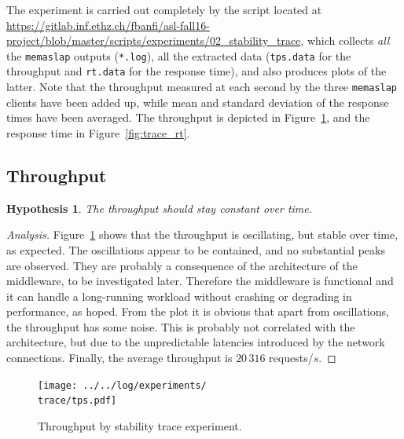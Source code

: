 \documentclass[11pt]{article}
\newtheorem{hyp}{Hypothesis}
\theoremstyle{definition}
\newenvironment{ana}[1][\proofname]{\begin{proof}[Analysis]}{\end{proof}}
\renewcommand\t\texttt
\newcommand\trace{02_stability_trace_16-10-20_20:38:14}
\begin{document}
The experiment is carried out completely by the script located at \url{https://gitlab.inf.ethz.ch/fbanfi/asl-fall16-project/blob/master/scripts/experiments/02_stability_trace}, which collects \emph{all} the \t{memaslap} outputs (\t{*.log}), all the extracted data (\t{tps.data} for the throughput and \t{rt.data} for the response time), and also produces plots of the latter.
Note that the throughput measured at each second by the three \t{memaslap} clients have been added up, while mean and standard deviation of the response times have been averaged.
The throughput is depicted in Figure~\ref{fig:trace_tps}, and the response time in Figure~\ref{fig:trace_rt}.

\subsection{Throughput}\label{ssec:tps}

\begin{hyp}
    The throughput should stay constant over time.
\end{hyp}

\begin{ana}
    Figure~\ref{fig:trace_tps} shows that the throughput is oscillating, but stable over time, as expected.
    The oscillations appear to be contained, and no substantial peaks are observed.
    They are probably a consequence of the architecture of the middleware, to be investigated later.
    Therefore the middleware is functional and it can handle a long-running workload without crashing or degrading in performance, as hoped.
    From the plot it is obvious that apart from oscillations, the throughput has some noise.
    This is probably not correlated with the architecture, but due to the unpredictable latencies introduced by the network connections.
    Finally, the average throughput is $20\,316$ requests/$s$.
\end{ana}

\begin{figure}[!h]
    \centering
    \texttt{[image: ../../log/experiments/\\trace/tps.pdf]}
    \caption{Throughput by stability trace experiment.}
    \label{fig:trace_tps}
\end{figure}

\end{document}
